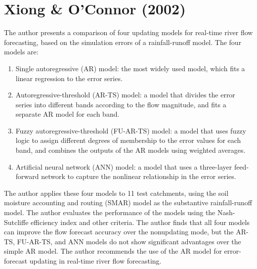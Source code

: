 \documentclass[a4paper,12pt]{report}
\begin{document}
\section{Xiong \& O'Connor (2002)}
The author presents a comparison of four updating models for real-time river flow forecasting, based on the simulation errors of a rainfall-runoff model. The four models are:
\begin{enumerate}
\item Single autoregressive (AR) model: the most widely used model, which fits a linear regression to the error series.
\item Autoregressive-threshold (AR-TS) model: a model that divides the error series into different bands according to the flow magnitude, and fits a separate AR model for each band.
\item Fuzzy autoregressive-threshold (FU-AR-TS) model: a model that uses fuzzy logic to assign different degrees of membership to the error values for each band, and combines the outputs of the AR models using weighted averages.
\item Artificial neural network (ANN) model: a model that uses a three-layer feed-forward network to capture the nonlinear relationship in the error series.
\end{enumerate}
The author applies these four models to 11 test catchments, using the soil moisture accounting and routing (SMAR) model as the substantive rainfall-runoff model. The author evaluates the performance of the models using the Nash-Sutcliffe efficiency index and other criteria. The author finds that all four models can improve the flow forecast accuracy over the nonupdating mode, but the AR-TS, FU-AR-TS, and ANN models do not show significant advantages over the simple AR model. The author recommends the use of the AR model for error-forecast updating in real-time river flow forecasting.
\end{document}
